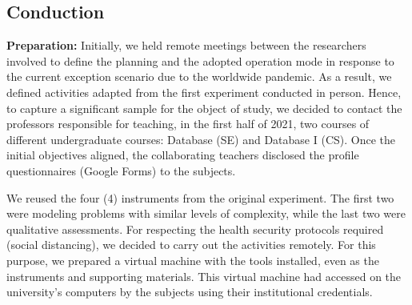 \subsection{Conduction}
\label{ssec_experiments:preliminary_conduction}

\textbf{Preparation:} 
Initially, we held remote meetings between the researchers involved to define the planning and the adopted operation mode in response to the current exception scenario due to the worldwide pandemic.
As a result, we defined activities adapted from the first experiment conducted in person.
Hence, to capture a significant sample for the object of study, we decided to contact the professors responsible for teaching, in the first half of 2021, two courses of different undergraduate courses: Database (SE) and Database I (CS).
Once the initial objectives aligned, the collaborating teachers disclosed the profile questionnaires (Google Forms) to the subjects.

We reused the four (4) instruments from the original experiment. 
The first two were modeling problems with similar levels of complexity, while the last two were qualitative assessments.
For respecting the health security protocols required (social distancing), we decided to carry out the activities remotely.
For this purpose, we prepared a virtual machine with the tools installed, even as the instruments and supporting materials. 
This virtual machine had accessed on the university's computers by the subjects using their institutional credentials.

